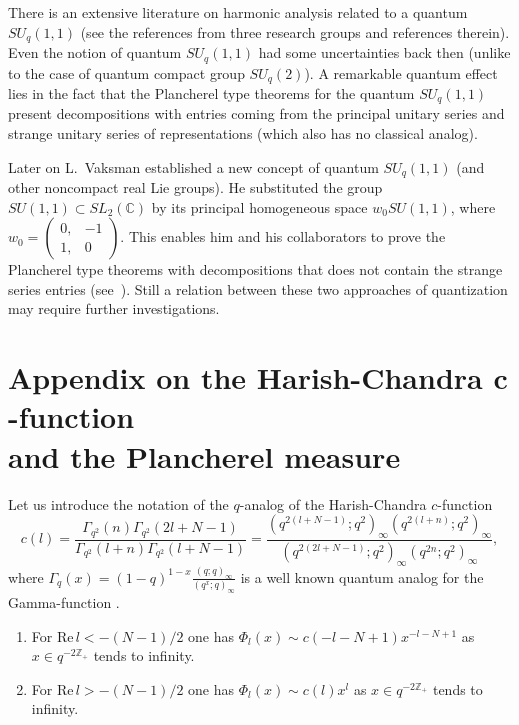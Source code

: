 \documentclass[pdftex]{sigma}
\begin{document}
\begin{remark}
There is an extensive literature on harmonic analysis related to a quantum $SU_q(1,1)$ (see the references
\cite{KSR,U,KV} from three research groups and references therein). Even the notion of quantum $SU_q(1,1)$
had some uncertainties back then (unlike to the case of quantum compact group $SU_q(2)$). A remarkable quantum ef\/fect lies in the fact that the
Plancherel type theorems for the quantum $SU_q(1,1)$ present decompositions with entries coming from the
principal unitary series and strange unitary series of representations (which also has no classical analog).

Later on L.~Vaksman established a new concept of quantum $SU_q(1,1)$ (and other noncompact real Lie groups).
He substituted the group $SU(1,1) \subset SL_2(\mathbb C)$ by its principal homogeneous space $w_0SU(1,1)$,
where $w_0=\begin{pmatrix}0, & -1 \\ 1, & 0\end{pmatrix}$. This enables him and his collaborators to prove
the Plancherel type theorems with decompositions that does not contain the strange series entries (see~\cite{SSV,BK}). Still a relation between these two approaches of quantization may require further
investigations.
\end{remark}


\appendix

\section[Appendix on the Harish-Chandra $c$-function and the Plancherel measure]{Appendix on the Harish-Chandra $\boldsymbol{c}$-function\\ and the Plancherel measure}\label{appendixA}

Let us introduce the notation of the $q$-analog of the Harish-Chandra $c$-function
\[
c(l)=\frac{\Gamma_{q^2}(n)\Gamma_{q^2}(2l+N-1)}{\Gamma_{q^2}(l+n)\Gamma_{q^2}(l+N-1)}=
\frac{(q^{2(l+N-1)};q^2)_\infty(q^{2(l+n)};q^2)_\infty}{(q^{2(2l+N-1)};q^2)_\infty(q^{2n};q^2)_\infty},
\]
where $\Gamma_q(x)=(1-q)^{1-x}\frac{(q;q)_\infty}{(q^x;q)_\infty}$ is a well known quantum analog for the
Gamma-function \cite{GR}.
\begin{lemma}\label{assymp}\qquad
\begin{enumerate}\itemsep=0pt
\item[$1.$] For $\mathrm{Re}\, l < -(N-1)/2$ one has $\Phi_l(x) \sim
c(-l-N+1)x^{-l-N+1}$ as $x \in q^{-2\mathbb Z_+}$ tends to infinity.
\item[$2.$] For $\mathrm{Re}\, l > -(N-1)/2$
one has $\Phi_l(x) \sim c(l)x^l$ as $x \in q^{-2\mathbb Z_+}$ tends to infinity.
\end{enumerate}
\end{lemma}
\end{document}
